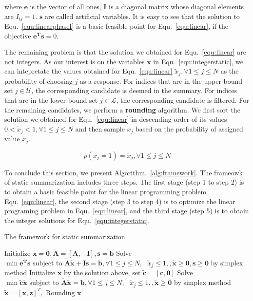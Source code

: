 \documentclass[envcountsame]{llncs}
\begin{document}
where $\mathbf{e}$ is the vector of all ones, $\mathbf{I}$ is a diagonal matrix whose diagonal elements are $I_{ij}=1$. $\mathbf{s}$ are called artificial variables. It is easy to see that the solution to Equ.~\ref{equ:linearphaseI} is a basic feasible point for Equ.~\ref{equ:linear}, if the objective $\mathbf{e^{T}s}=0 $.

The remaining problem is that the solution we obtained for Equ.~\ref{equ:linear} are not integers. As our interest is on the variables $\mathbf{x}$ in Equ.~\ref{equ:integerstatic}, we can intepretate the values obtained for Equ.~\ref{equ:linear} $\tilde{x}_j, \forall 1\leq j\leq N $ as the probability of choosing $j$ as a response. For indices that are in the upper bound set $j \in \mathcal{U}$, the corresponding candidate is deemed in the summary. For indices that are in the lower bound set $j \in \mathcal{L}$, the corresponding candidate is filtered. For the remaining candidates, we perform a \textbf{rounding} algorithm. We first sort the solution we obtained for Equ.~\ref{equ:linear} in descending order of its values $0< \tilde{x}_j< 1,\forall 1\leq j\leq N$ and then sample $x_j$ based on the probability of assigned value $\tilde{x}_j$. 

\begin{equation}
p(x_j=1)= \tilde{x}_j, \forall 1\leq j \leq N
\end{equation}



To conclude this section, we present Algorithm.~\ref{alg:framework}. The frameowk of static summarization includes three steps. The first stage (step 1 to step 2) is to obtain a basic feasible point for the linear programming problem Equ.~\ref{equ:linear}, the second stage (step 3 to step 4) is to optimize the linear programing problem in Equ.~\ref{equ:linear}, and the third stage (step 5) is to obtain the integer solutions for Equ.~\ref{equ:integerstatic}.   

\begin{algorithm}\label{alg:framework}
\caption{The framework for static summarization}

Initialize $\tilde{\mathbf{x}}=\mathbf{0},\tilde{\mathbf{A}}=[\mathbf{A},-\mathbf{I}],\mathbf{s}=\mathbf{b}$\;
Solve $\min \mathbf{e^{T}s} \textrm{ subject to } \tilde{\mathbf{A}}\tilde{\mathbf{x}} + \mathbf{Is} = \mathbf{b},  \forall 1\leq j\leq N,\textrm{ } \tilde{x}_j \leq 1, ,\tilde{\mathbf{x}}\geq \mathbf{0}, \mathbf{s}\geq \mathbf{0}$ by simplex method\;
Initialize $\tilde{\mathbf{x}}$ by the solution above, set $\tilde{\mathbf{c}}=[\mathbf{c},\mathbf{0}]$  \;
Solve $\min \tilde{\mathbf{c}}\tilde{\mathbf{x}}\textrm{ subject to } \tilde{\mathbf{A}}\tilde{\mathbf{x}} = \mathbf{b}, \forall 1\leq j\leq N,\textrm{ } \tilde{x}_j \leq 1, ,\tilde{\mathbf{x}}\geq \mathbf{0}$ by simplex method\;
$\tilde{\mathbf{x}}=[\mathbf{x},\mathbf{z}]^T,$ Rounding $\mathbf{x}$\;
\end{algorithm}
\end{document}
